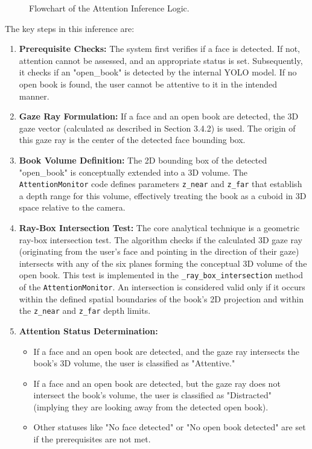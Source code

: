 \begin{figure}[h!]
{\begin{tikzpicture}
\end{tikzpicture}%
}
\caption{Flowchart of the Attention Inference Logic.}
\label{fig:attention_inference_flowchart}
\end{figure}

The key steps in this inference are:
\begin{enumerate}
    \item \textbf{Prerequisite Checks:} The system first verifies if a face is detected. If not, attention cannot be assessed, and an appropriate status is set. Subsequently, it checks if an "open\_book" is detected by the internal YOLO model. If no open book is found, the user cannot be attentive to it in the intended manner.
    \item \textbf{Gaze Ray Formulation:} If a face and an open book are detected, the 3D gaze vector (calculated as described in Section 3.4.2) is used. The origin of this gaze ray is the center of the detected face bounding box.
    \item \textbf{Book Volume Definition:} The 2D bounding box of the detected "open\_book" is conceptually extended into a 3D volume. The \texttt{AttentionMonitor} code defines parameters \texttt{z\_near} and \texttt{z\_far} that establish a depth range for this volume, effectively treating the book as a cuboid in 3D space relative to the camera.
    \item \textbf{Ray-Box Intersection Test:} The core analytical technique is a geometric ray-box intersection test. The algorithm checks if the calculated 3D gaze ray (originating from the user's face and pointing in the direction of their gaze) intersects with any of the six planes forming the conceptual 3D volume of the open book. This test is implemented in the \texttt{\_ray\_box\_intersection} method of the \texttt{AttentionMonitor}. An intersection is considered valid only if it occurs within the defined spatial boundaries of the book's 2D projection and within the \texttt{z\_near} and \texttt{z\_far} depth limits.
    \item \textbf{Attention Status Determination:}
    \begin{itemize}
        \item If a face and an open book are detected, and the gaze ray intersects the book's 3D volume, the user is classified as "Attentive."
        \item If a face and an open book are detected, but the gaze ray does not intersect the book's volume, the user is classified as "Distracted" (implying they are looking away from the detected open book).
        \item Other statuses like "No face detected" or "No open book detected" are set if the prerequisites are not met.
    \end{itemize}
\end{enumerate}

